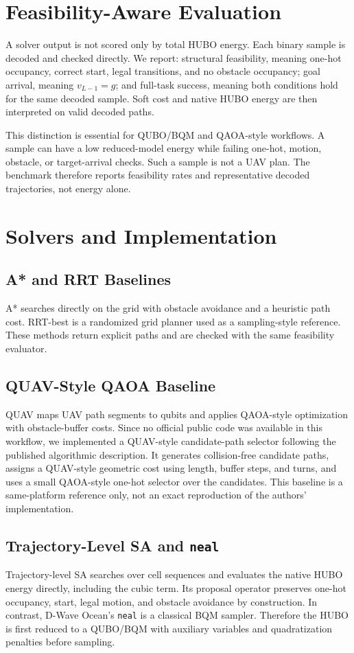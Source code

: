 \documentclass[10pt,conference]{IEEEtran}
\begin{document}
\section{Feasibility-Aware Evaluation}
A solver output is not scored only by total HUBO energy. Each binary sample is decoded and checked directly. We report: structural feasibility, meaning one-hot occupancy, correct start, legal transitions, and no obstacle occupancy; goal arrival, meaning $v_{L-1}=g$; and full-task success, meaning both conditions hold for the same decoded sample. Soft cost and native HUBO energy are then interpreted on valid decoded paths.

This distinction is essential for QUBO/BQM and QAOA-style workflows. A sample can have a low reduced-model energy while failing one-hot, motion, obstacle, or target-arrival checks. Such a sample is not a UAV plan. The benchmark therefore reports feasibility rates and representative decoded trajectories, not energy alone.

\section{Solvers and Implementation}
\subsection{A* and RRT Baselines}
A* searches directly on the grid with obstacle avoidance and a heuristic path cost. RRT-best is a randomized grid planner used as a sampling-style reference. These methods return explicit paths and are checked with the same feasibility evaluator.

\subsection{QUAV-Style QAOA Baseline}
QUAV maps UAV path segments to qubits and applies QAOA-style optimization with obstacle-buffer costs. Since no official public code was available in this workflow, we implemented a QUAV-style candidate-path selector following the published algorithmic description. It generates collision-free candidate paths, assigns a QUAV-style geometric cost using length, buffer steps, and turns, and uses a small QAOA-style one-hot selector over the candidates. This baseline is a same-platform reference only, not an exact reproduction of the authors' implementation.

\subsection{Trajectory-Level SA and \texttt{neal}}
Trajectory-level SA searches over cell sequences and evaluates the native HUBO energy directly, including the cubic term. Its proposal operator preserves one-hot occupancy, start, legal motion, and obstacle avoidance by construction. In contrast, D-Wave Ocean's \texttt{neal} is a classical BQM sampler. Therefore the HUBO is first reduced to a QUBO/BQM with auxiliary variables and quadratization penalties before sampling.
\end{document}
